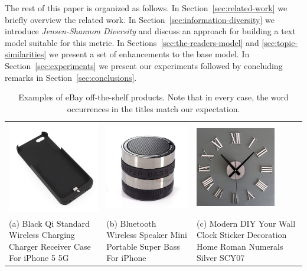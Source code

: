 The rest of this paper is organized as follows. In Section~\ref{sec:related-work} we briefly overview the related work. In Section~\ref{sec:information-diversity} we introduce {\em Jensen-Shannon Diversity} and discuss an approach for building a text model suitable for this metric. In Sections~\ref{sec:the-readers-model} and \ref{sec:topic-similarities} we present a set of enhancements to the base model. In Section~\ref{sec:experiments} we present our experiments followed by concluding remarks in Section~\ref{sec:conclusions}.

\begin{table}[t]
\caption{Examples of eBay off-the-shelf products. Note that in every case, the word occurrences in the titles match our expectation.}
\label{tab:ebay-standard-products}
\begin{center}
\begin{tabular}{LLL}
\includegraphics[height=4.0cm]{figures/standard-iphone-case.jpg}&\includegraphics[height=4.0cm]{figures/standard-iphone-speaker.jpg}&\includegraphics[height=3.5cm]{figures/standard-clock.jpg}\\
(a) Black Qi Standard Wireless Charging Charger Receiver Case For iPhone 5 5G & (b) Bluetooth Wireless Speaker Mini Portable Super Bass For iPhone & (c) Modern DIY Your Wall Clock Sticker Decoration Home Roman Numerals Silver SCY07\\
\end{tabular}
\end{center}
\end{table}


